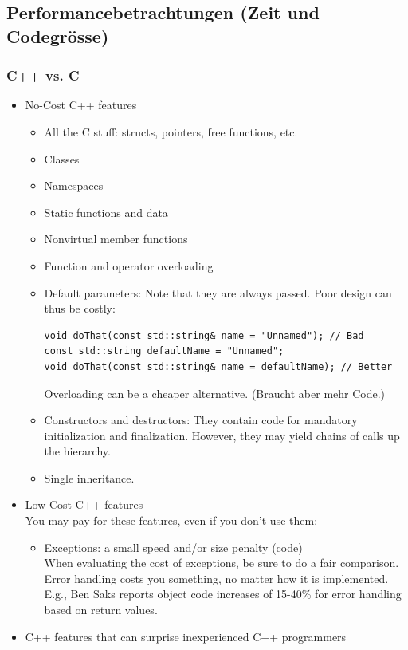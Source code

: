 \subsection{Performancebetrachtungen (Zeit und Codegrösse)}
\subsubsection{C++ vs. C}
\begin{itemize}
	\item No-Cost C++ features
		\begin{itemize}
			\item All the C stuff: structs, pointers, free functions, etc.
			\item Classes
			\item Namespaces
			\item Static functions and data
			\item Nonvirtual member functions
			\item Function and operator overloading
			\item Default parameters: Note that they are always passed. Poor design can thus be costly:
				\begin{lstlisting}
void doThat(const std::string& name = "Unnamed"); // Bad
const std::string defaultName = "Unnamed";
void doThat(const std::string& name = defaultName); // Better
				\end{lstlisting}
				Overloading can be a cheaper alternative. (Braucht aber mehr Code.)
			\item  Constructors and destructors: They contain code for mandatory initialization and finalization. However, they may yield chains of calls up the hierarchy.
			\item Single inheritance.
		\end{itemize}
	\item Low-Cost C++ features\\ You may pay for these features, even if you don't use them:
		\begin{itemize}
			\item Exceptions: a small speed and/or size penalty (code)\\
			When evaluating the cost of exceptions, be sure to do a fair comparison. Error handling costs you something, no matter how it is implemented.\\
			E.g., Ben Saks reports object code increases of 15-40\% for error handling based on return values.
		\end{itemize}
	\item C++ features that can surprise inexperienced C++ programmers\\

\end{itemize}
